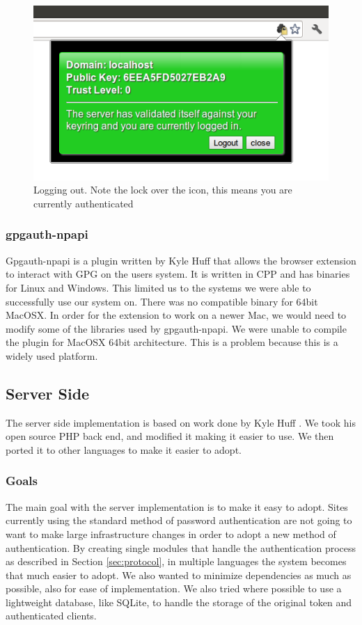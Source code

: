 \documentclass[11pt]{article}
\begin{document}
\begin{figure}[h!]
\centering
\includegraphics[scale=0.5]{ext_logout}
\caption{Logging out. Note the lock over the icon, this means you are currently authenticated}
\label{fig:logout}
\end{figure}

\FloatBarrier
\subsubsection{gpgauth-npapi} \label{subsubsec:npapi}
Gpgauth-npapi is a plugin written by Kyle Huff that allows the browser extension to interact with GPG on the users system. It is written in CPP and has binaries for Linux and Windows. This limited us to the systems we were able to successfully use our system on. There was no compatible binary for 64bit MacOSX. In order for the extension to work on a newer Mac, we would need to modify some of the libraries used by gpgauth-npapi. We were unable to compile the plugin for MacOSX 64bit architecture. This is a problem because this is a widely used platform.
\subsection{Server Side}
The server side implementation is based on work done by Kyle Huff \cite{gpgauth}. We took his open source PHP back end, and modified it making it easier to use. We then ported it to other languages to make it easier to adopt.
\subsubsection{Goals}
The main goal with the server implementation is to make it easy to adopt. Sites currently using the standard method of password authentication are not going to want to make large infrastructure changes in order to adopt a new method of authentication. By creating single modules that handle the authentication process as described in Section \ref{sec:protocol}, in multiple languages the system becomes that much easier to adopt. We also wanted to minimize dependencies as much as possible, also for ease of implementation. We also tried where possible to use a lightweight database, like SQLite, to handle the storage of the original token and authenticated clients. 
\end{document}
